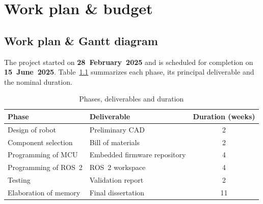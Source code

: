 \chapter{Work plan \& budget}\label{sec:work_plan_budget}

\section{Work plan \& Gantt diagram}

The project started on \textbf{28~February~2025} and is scheduled for completion on \textbf{15~June~2025}. Table~\ref{tab:phases} summarizes each phase, its principal deliverable and the nominal duration.

\begin{table}[H]
  \centering
  \begin{tabular}{llc}
    \toprule
    \textbf{Phase}        & \textbf{Deliverable}         & \textbf{Duration (weeks)} \\
    \midrule
    Design of robot       & Preliminary CAD              & 2                         \\
    Component selection   & Bill of materials            & 2                         \\
    Programming of MCU    & Embedded firmware repository & 4                         \\
    Programming of ROS~2  & ROS~2 workspace              & 4                         \\
    Testing               & Validation report            & 2                         \\
    Elaboration of memory & Final dissertation           & 11                        \\
    \bottomrule
  \end{tabular}
  \caption{Phases, deliverables and duration}
  \label{tab:phases}
\end{table}


